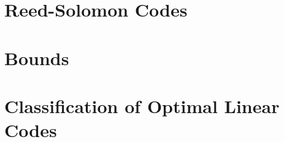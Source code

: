 


\clearpage

\section{Reed-Solomon Codes}
\label{sec:Reed:Solomon}






\clearpage

\section{Bounds}
\label{sec:Bounds}






\clearpage

\section{Classification of Optimal Linear Codes}
\label{sec:coding:classification}






